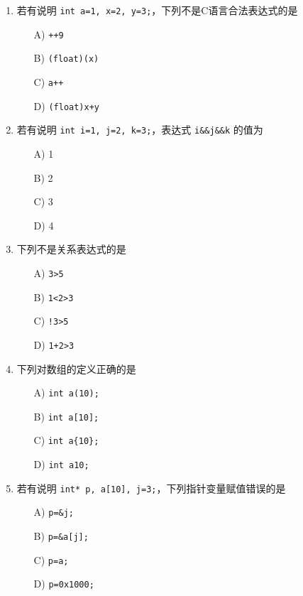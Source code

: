 \documentclass[a4paper,12pt]{article}
\begin{document}
\begin{enumerate}
	\item 若有说明 \texttt{int a=1, x=2, y=3;}，下列不是C语言合法表达式的是
	      \begin{enumerate}
		      \item[A)] \texttt{++9}
		      \item[B)] \texttt{(float)(x)}
		      \item[C)] \texttt{a++}
		      \item[D)] \texttt{(float)x+y}
	      \end{enumerate}
	      \vspace{0.3cm}

	\item 若有说明 \texttt{int i=1, j=2, k=3;}，表达式 \texttt{i\&\&j\&\&k} 的值为
	      \begin{enumerate}
		      \item[A)] 1
		      \item[B)] 2
		      \item[C)] 3
		      \item[D)] 4
	      \end{enumerate}
	      \vspace{0.3cm}

	\item 下列不是关系表达式的是
	      \begin{enumerate}
		      \item[A)] \texttt{3>5}
		      \item[B)] \texttt{1<2>3}
		      \item[C)] \texttt{!3>5}
		      \item[D)] \texttt{1+2>3}
	      \end{enumerate}
	      \vspace{0.3cm}

	\item 下列对数组的定义正确的是
	      \begin{enumerate}
		      \item[A)] \texttt{int a(10);}
		      \item[B)] \texttt{int a[10];}
		      \item[C)] \texttt{int a\{10\};}
		      \item[D)] \texttt{int a10;}
	      \end{enumerate}
	      \vspace{0.3cm}

	\item 若有说明 \texttt{int* p, a[10], j=3;}，下列指针变量赋值错误的是
	      \begin{enumerate}
		      \item[A)] \texttt{p=\&j;}
		      \item[B)] \texttt{p=\&a[j];}
		      \item[C)] \texttt{p=a;}
		      \item[D)] \texttt{p=0x1000;}
	      \end{enumerate}
	      \vspace{0.3cm}


\end{enumerate}
\end{document}
